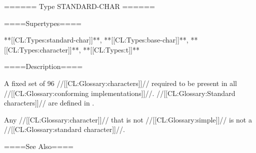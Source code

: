 ====== Type STANDARD-CHAR ======

====Supertypes====

**[[CL:Types:standard-char]]**, **[[CL:Types:base-char]]**, **[[CL:Types:character]]**, **[[CL:Types:t]]**

====Description====

A fixed set of 96 //[[CL:Glossary:characters]]// required to be present in all //[[CL:Glossary:conforming implementations]]//. //[[CL:Glossary:Standard characters]]// are defined in \secref\StandardChars.

Any //[[CL:Glossary:character]]// that is not //[[CL:Glossary:simple]]// is not a //[[CL:Glossary:standard character]]//.

====See Also====

{\secref\StandardChars}

  
